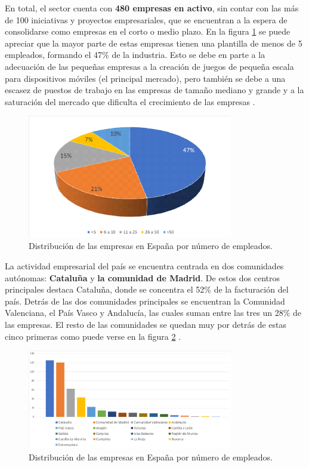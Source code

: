 En total, el sector cuenta con \textbf{480 empresas en activo}, sin contar con las más de 100 iniciativas y proyectos empresariales, que se encuentran a la espera de consolidarse como empresas en el corto o medio plazo. En la figura \ref{distribucion-tamano-esp} se puede apreciar que la mayor parte de estas empresas tienen una plantilla de menos de 5 empleados, formando el 47\% de la industria. Esto se debe en parte a la adecuación de las pequeñas empresas a la creación de juegos de pequeña escala para dispositivos móviles (el principal mercado), pero también se debe a una escasez de puestos de trabajo en las empresas de tamaño mediano y grande y a la saturación del mercado que dificulta el crecimiento de las empresas \cite{libro_blanco}.
\begin{figure}[!t]
    \centering
    \includegraphics[width=0.8\textwidth]{images/estadodelarte/mercado/distribucion-tamano-esp}
    \caption{Distribución de las empresas en España por número de empleados.}
    \label{distribucion-tamano-esp}
\end{figure}

La actividad empresarial del país se encuentra centrada en dos comunidades autónomas: \textbf{Cataluña} y \textbf{la comunidad de Madrid}. De estos dos centros principales destaca Cataluña, donde se concentra el 52\% de la facturación del país. Detrás de las dos comunidades principales se encuentran la Comunidad Valenciana, el País Vasco y Andalucía, las cuales suman entre las tres un 28\% de las empresas. El resto de las comunidades se quedan muy por detrás de estas cinco primeras como puede verse en la figura \ref{distribucion-comunidades-esp} \cite{libro_blanco}.
\begin{figure}[h]
    \centering
    \includegraphics[width=0.8\textwidth]{images/estadodelarte/mercado/distribucion-comunidades-esp}
    \caption{Distribución de las empresas en España por número de empleados.}
    \label{distribucion-comunidades-esp}
\end{figure}

